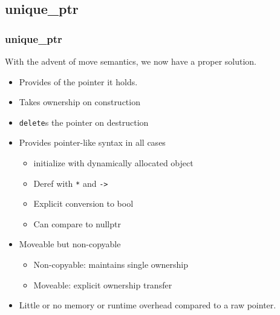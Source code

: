 \subsection{unique\_ptr}


\begin{frame}[fragile]
\frametitle{unique\_ptr}

With the advent of move semantics, we now have a proper solution.


\begin{itemize}
\item Provides  of the pointer it holds.
\item Takes ownership on construction
\item \texttt{delete}s the pointer on destruction
\item Provides pointer-like syntax in all cases
\begin{itemize}
  \item initialize with dynamically allocated object
  \item Deref with \texttt{*} and \texttt{->}
  \item Explicit conversion to bool
  \item Can compare to nullptr
\end{itemize}
\item Moveable but non-copyable
\begin{itemize}
  \item Non-copyable: maintains single ownership
  \item Moveable: explicit ownership transfer
\end{itemize}
\item Little or no memory or runtime overhead compared to a raw pointer.
\end{itemize}

\end{frame}


